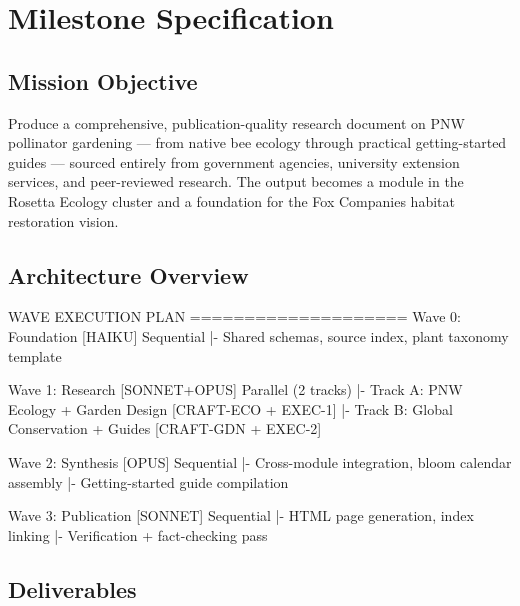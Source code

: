 \documentclass[11pt,letterpaper]{article}
\newcommand{\stageheader}[2]{%
  \noindent\colorbox{#2}{\makebox[\textwidth][l]{%
    \textcolor{white}{\bfseries\sffamily\hspace{6pt}#1\hspace{6pt}}}}%
  \vspace{0.5em}\par%
}
\begin{document}
\newpage

\stageheader{STAGE 3 --- MISSION PACKAGE}{tertiary}

\section{Milestone Specification}

\subsection{Mission Objective}

Produce a comprehensive, publication-quality research document on PNW pollinator gardening --- from native bee ecology through practical getting-started guides --- sourced entirely from government agencies, university extension services, and peer-reviewed research. The output becomes a module in the Rosetta Ecology cluster and a foundation for the Fox Companies habitat restoration vision.

\subsection{Architecture Overview}

\begin{asciibox}
WAVE EXECUTION PLAN
====================
Wave 0: Foundation     [HAIKU]     Sequential
  |- Shared schemas, source index, plant taxonomy template

Wave 1: Research       [SONNET+OPUS]  Parallel (2 tracks)
  |- Track A: PNW Ecology + Garden Design    [CRAFT-ECO + EXEC-1]
  |- Track B: Global Conservation + Guides   [CRAFT-GDN + EXEC-2]

Wave 2: Synthesis      [OPUS]      Sequential
  |- Cross-module integration, bloom calendar assembly
  |- Getting-started guide compilation

Wave 3: Publication    [SONNET]    Sequential
  |- HTML page generation, index linking
  |- Verification + fact-checking pass
\end{asciibox}

\subsection{Deliverables}
\end{document}
